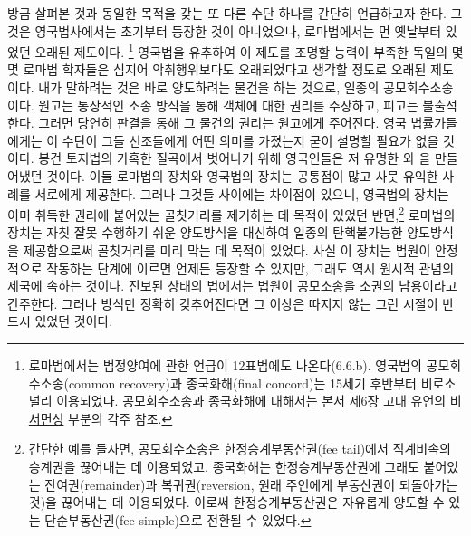 방금 살펴본 것과 동일한 목적을 갖는 또 다른 수단 하나를
간단히 언급하고자 한다.
그것은 영국법사에서는 초기부터 등장한 것이 아니었으나,
로마법에서는 먼 옛날부터 있었던 오래된 제도이다.%
\footnote{%
  로마법에서는 법정양여에 관한 언급이 12표법에도 나온다(6.6.b).
  영국법의 공모회수소송(common recovery)과 종국화해(final concord)는
  15세기 후반부터 비로소 널리 이용되었다.
  공모회수소송과 종국화해에 대해서는
  본서 제6장 \hyperlink{finerecovery}{고대 유언의 비서면성} 부분의 각주 참조.
  }
영국법을 유추하여 이 제도를 조명할 능력이 부족한
독일의 몇몇 로마법 학자들은 심지어 악취행위보다도 오래되었다고
생각할 정도로 오래된 제도이다.
내가 말하려는 것은 바로
양도하려는 물건을
하는 것으로,
일종의 공모회수소송이다.
원고는 통상적인 소송 방식을 통해 객체에 대한 권리를 주장하고,
피고는 불출석한다. 그러면 당연히 판결을 통해 그 물건의 권리는
원고에게 주어진다.
영국 법률가들에게는
이 수단이 그들 선조들에게 어떤 의미를 가졌는지 굳이 설명할 필요가 없을 것이다.
봉건 토지법의 가혹한 질곡에서 벗어나기 위해
영국인들은
저 유명한
와 을 만들어냈던
것이다.
이들 로마법의 장치와 영국법의 장치는 공통점이 많고
사뭇 유익한 사례를 서로에게 제공한다.
그러나 그것들 사이에는 차이점이 있으니,
영국법의 장치는
이미 취득한 권리에 붙어있는 골칫거리를 제거하는 데 목적이 있었던
반면,\footnote{%
  간단한 예를 들자면,
  공모회수소송은 한정승계부동산권(fee tail)에서 직계비속의 승계권을
  끊어내는 데 이용되었고,
  종국화해는 한정승계부동산권에 그래도 붙어있는
  잔여권(remainder)과 복귀권(reversion,
  원래 주인에게 부동산권이 되돌아가는 것)을 끊어내는 데 이용되었다.
  이로써 한정승계부동산권은 자유롭게 양도할 수 있는
  단순부동산권(fee simple)으로 전환될 수 있었다. }
로마법의 장치는
자칫 잘못 수행하기 쉬운 양도방식을 대신하여
일종의 탄핵불가능한 양도방식을 제공함으로써 골칫거리를 미리 막는 데
목적이 있었다.
사실 이 장치는 법원이 안정적으로 작동하는 단계에 이르면
언제든 등장할 수 있지만,
그래도 역시 원시적 관념의 제국에 속하는 것이다.
진보된 상태의 법에서는 법원이
공모소송을 소권의 남용이라고 간주한다.
그러나 방식만 정확히 갖추어진다면
그 이상은 따지지 않는 그런 시절이 반드시 있었던 것이다.

